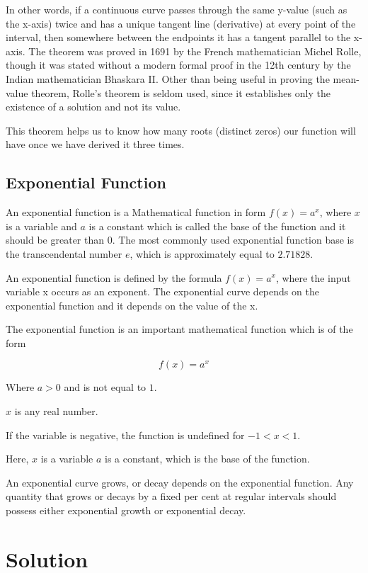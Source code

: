 \documentclass{article}
\begin{document}
    In other words, if a continuous curve passes through the same y-value (such as the x-axis) twice and has a unique tangent line (derivative) at every point of the interval, then somewhere between the endpoints it has a tangent parallel to the x-axis. The theorem was proved in 1691 by the French mathematician Michel Rolle, though it was stated without a modern formal proof in the 12th century by the Indian mathematician Bhaskara II. Other than being useful in proving the mean-value theorem, Rolle’s theorem is seldom used, since it establishes only the existence of a solution and not its value.

    This theorem helps us to know how many roots (distinct zeros) our function will have once we have derived it three times.

    \subsection{Exponential Function}
    An exponential function is a Mathematical function in form $f(x) = a^x$, where $x$ is a variable and $a$ is a constant which is called the base of the function and it should be greater than $0$. The most commonly used exponential function base is the transcendental number $e$, which is approximately equal to $2.71828$.
    
    An exponential function is defined by the formula $f(x) = a^x$, where the input variable x occurs as an exponent. The exponential curve depends on the exponential function and it depends on the value of the x.

    The exponential function is an important mathematical function which is of the form

    $$f(x) = a^x$$

    Where $a > 0$ and is not equal to $1$.

    $x$ is any real number.

    If the variable is negative, the function is undefined for $-1 < x < 1$.

    \pagebreak
    Here,
    $x$ is a variable
    $a$ is a constant, which is the base of the function.

    An exponential curve grows, or decay depends on the exponential function. Any quantity that grows or decays by a fixed per cent at regular intervals should possess either exponential growth or exponential decay.

    \section{Solution}
\end{document}
